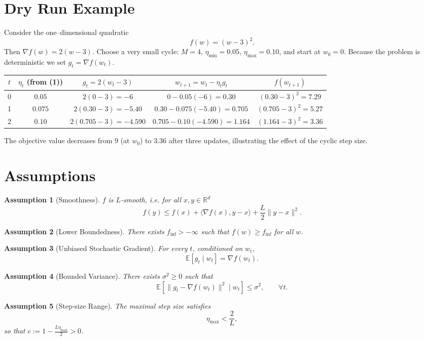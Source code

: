 \documentclass{article}
\newtheorem{assumption}{Assumption}
\newcommand{\E}{\mathbb{E}}
\newcommand{\R}{\mathbb{R}}
\begin{document}
\section*{Dry Run Example}
Consider the one–dimensional quadratic 
\[
f(w)=(w-3)^2 .
\]
Then $\nabla f(w)=2(w-3)$.  
Choose a very small cycle: $M=4$, $\eta_{\min}=0.05$, $\eta_{\max}=0.10$, and start at $w_0=0$.  
Because the problem is deterministic we set $g_t=\nabla f(w_t)$.

\begin{center}
\begin{tabular}{c|c|c|c|c}
$t$ & $\eta_t$ (from (1)) & $g_t=2(w_t-3)$ & $w_{t+1}=w_t-\eta_t g_t$ & $f(w_{t+1})$\\ \hline
0 & $0.05$ & $2(0-3)=-6$ & $0-0.05(-6)=0.30$ & $(0.30-3)^2=7.29$\\
1 & $0.075$ & $2(0.30-3)=-5.40$ & $0.30-0.075(-5.40)=0.705$ & $(0.705-3)^2=5.27$\\
2 & $0.10$ & $2(0.705-3)=-4.590$ & $0.705-0.10(-4.590)=1.164$ & $(1.164-3)^2=3.36$\\
\end{tabular}
\end{center}
The objective value decreases from $9$ (at $w_0$) to $3.36$ after three updates, illustrating the effect of the cyclic step size.

\newpage

\section*{Assumptions}
\begin{assumption}[Smoothness]
$f$ is $L$‑smooth, i.e. for all $x,y\in\R^{d}$
\[
f(y)\le f(x)+\langle\nabla f(x),y-x\rangle+\frac{L}{2}\|y-x\|^2 .
\tag{3}
\]
\end{assumption}
\begin{assumption}[Lower Boundedness]
There exists $f_{\inf}>-\infty$ such that $f(w)\ge f_{\inf}$ for all $w$.
\end{assumption}
\begin{assumption}[Unbiased Stochastic Gradient]
For every $t$, conditioned on $w_t$,
\[
\E\!\left[g_t\mid w_t\right]=\nabla f(w_t).
\tag{4}
\]
\end{assumption}
\begin{assumption}[Bounded Variance]
There exists $\sigma^2\ge0$ such that
\[
\E\!\left[\|g_t-\nabla f(w_t)\|^2\mid w_t\right]\le\sigma^2,\qquad\forall t .
\tag{5}
\]
\end{assumption}
\begin{assumption}[Step‑size Range]
The maximal step size satisfies
\[
\eta_{\max}<\frac{2}{L},
\tag{6}
\]
so that $c:=1-\frac{L\eta_{\max}}{2}>0$.
\end{assumption}
\end{document}
